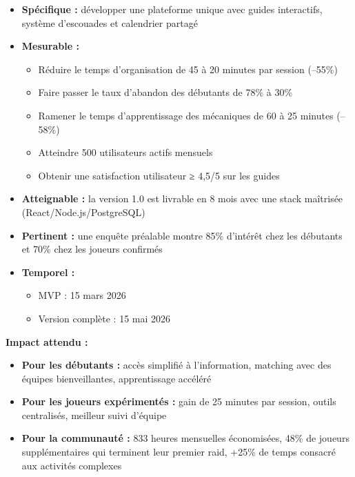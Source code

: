 \begin{itemize}
    \itemsep0.5em
    \item \textbf{Spécifique :} développer une plateforme unique avec guides interactifs, système d'escouades et calendrier partagé
    \item \textbf{Mesurable :}
    \begin{itemize}
        \item Réduire le temps d'organisation de 45 à 20 minutes par session (–55\%)
        \item Faire passer le taux d'abandon des débutants de 78\% à 30\%
        \item Ramener le temps d'apprentissage des mécaniques de 60 à 25 minutes (–58\%)
        \item Atteindre 500 utilisateurs actifs mensuels
        \item Obtenir une satisfaction utilisateur ≥ 4,5/5 sur les guides
    \end{itemize}
    \item \textbf{Atteignable :} la version 1.0 est livrable en 8 mois avec une stack maîtrisée (React/Node.js/PostgreSQL)
    \item \textbf{Pertinent :} une enquête préalable montre 85\% d'intérêt chez les débutants et 70\% chez les joueurs confirmés
    \item \textbf{Temporel :}
    \begin{itemize}
        \item MVP : 15 mars 2026
        \item Version complète : 15 mai 2026
    \end{itemize}
\end{itemize}

\vspace{0.5em}

\textbf{Impact attendu :}

\begin{itemize}
    \itemsep0.5em
    \item \textbf{Pour les débutants :} accès simplifié à l'information, matching avec des équipes bienveillantes, apprentissage accéléré
    \item \textbf{Pour les joueurs expérimentés :} gain de 25 minutes par session, outils centralisés, meilleur suivi d'équipe
    \item \textbf{Pour la communauté :} 833 heures mensuelles économisées, 48\% de joueurs supplémentaires qui terminent leur premier raid, +25\% de temps consacré aux activités complexes
\end{itemize}


